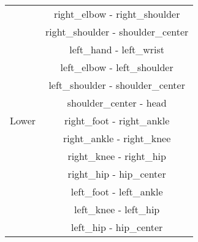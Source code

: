 \begin{figure}[H]
\begin{minipage}{0.43\linewidth}
{\begin{tabular}{|c|c|}
                & right\_elbow - right\_shoulder \\
                & right\_shoulder - shoulder\_center \\
                & left\_hand - left\_wrist \\
                & left\_elbow - left\_shoulder \\
                & left\_shoulder - shoulder\_center \\
                & shoulder\_center - head \\
                \hline
                Lower & right\_foot - right\_ankle \\
                & right\_ankle - right\_knee \\
                & right\_knee - right\_hip \\
                & right\_hip - hip\_center \\
                & left\_foot - left\_ankle \\
                & left\_knee - left\_hip \\
                & left\_hip - hip\_center \\
                \hline
            \end{tabular}
        }
        \caption{}
        \label{tab:top_bottom}
    \end{minipage}


\end{figure}
